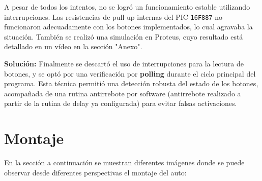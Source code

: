 \documentclass[]{article}
\begin{document}
	A pesar de todos los intentos, no se logró un funcionamiento estable utilizando interrupciones. Las resistencias de pull-up internas del PIC \texttt{16F887} no funcionaron adecuadamente con los botones implementados, lo cual agravaba la situación. También se realizó una simulación en Proteus, cuyo resultado está detallado en un vídeo en la sección "Anexo".
	
	\textbf{Solución:} Finalmente se descartó el uso de interrupciones para la lectura de botones, y se optó por una verificación por \textbf{polling} durante el ciclo principal del programa. Esta técnica permitió una detección robusta del estado de los botones, acompañada de una rutina antirrebote por software (antirrebote realizado a partir de la rutina de delay ya configurada) para evitar falsas activaciones.
	
	\section{Montaje}
	
	En la sección a continuación se muestran diferentes imágenes donde se puede observar desde diferentes perspectivas el montaje del auto:
	
	\newpage
	\thispagestyle{fancy}
	
\end{document}
